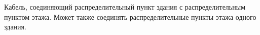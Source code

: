 Кабель, соединяющий распределительный пункт здания с
распределительным пунктом этажа. Может также соединять 
распределительные пункты этажа одного здания.